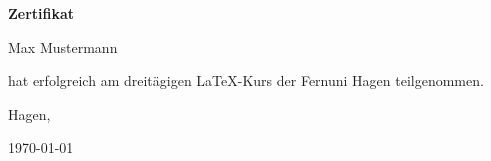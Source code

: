 \documentclass[16pt,ngerman]{scrartcl}
\begin{document}
\centering\Huge

\textbf{Zertifikat}
\vspace{20mm}
\begin{center}
Max Mustermann%
\end{center}
\vspace{1cm}\huge

hat erfolgreich am dreitägigen \LaTeX-Kurs der Fernuni Hagen teilgenommen. \vspace{2cm}\LARGE\flushleft

Hagen, \hfill\hdashrule[0.75ex]{9.5cm}{1pt}{2mm}

\today

\begin{center}
\vfill{}
\end{center}
\end{document}
